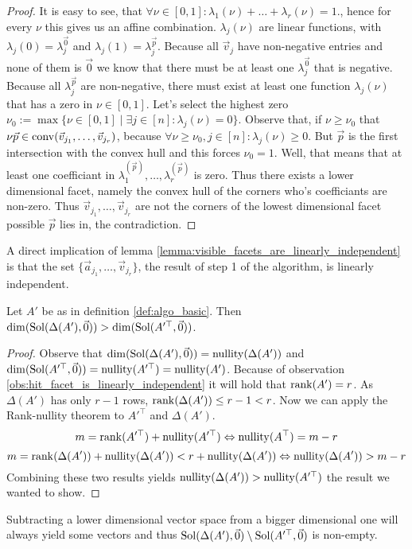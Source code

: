 \begin{proof}
    It is easy to see, that $\forall \nu\in[0, 1]: \lambda_1(\nu) + \dots + \lambda_r(\nu) = 1$., hence for every $\nu$ this gives us an affine combination. $\lambda_j(\nu)$ are linear functions, with $\lambda_j(0) = \lambda_j^{\vec 0}$ and $\lambda_j(1) = \lambda_j^{\vec p}$. Because all $\vec v_j$ have non-negative entries and none of them is $\vec 0$ we know that there must be at least one $\lambda_j^{\vec 0}$ that is negative. Because all $\lambda_j^{\vec p}$ are non-negative, there must exist at least one function $\lambda_j(\nu)$ that has a zero in $\nu \in [0, 1]$. Let's select the highest zero $\nu_0 := \max\{\nu \in [0, 1]\mid \exists j\in [n]\colon \lambda_j(\nu) = 0\}$. Observe that, if $\nu \geq \nu_0$ that $\nu\vec p \in \operatorname{conv}(\vec v_{j_1}, \dots, \vec v_{j_r})$, because $\forall \nu \geq \nu_0, j\in[n]\colon \lambda_j(\nu) \geq 0$. But $\vec p$ is the first intersection with the convex hull and this forces $\nu_0 = 1$. Well, that means that at least one coefficiant in $\lambda^{(\vec p)}_1, \dots, \lambda^{(\vec p)}_r$ is zero. Thus there exists a lower dimensional facet, namely the convex hull of the corners who's coefficiants are non-zero. Thus $\vec v_{j_1}, \dots, \vec v_{j_r}$ are not the corners of the lowest dimensional facet possible $\vec p$ lies in, the contradiction.
\end{proof}

\begin{observation}
    \label{obs:hit_facet_is_linearly_independent}
    A direct implication of lemma \ref{lemma:visible_facets_are_linearly_independent} is that the set $\{\vec a_{j_1}, \dots, \vec v_{j_r}\}$, the result of step 1 of the algorithm, is linearly independent.  
\end{observation}

\begin{lemma}
    \label{lemma:solspace_big_enough}
    Let $A'$ be as in definition \ref{def:algo_basic}. Then $\dim(\operatorname{Sol}(\Delta(A'), \vec0)) > \dim(\operatorname{Sol}(A'^\top, \vec0))$.
\end{lemma}
\begin{proof}
    Observe that $\dim(\operatorname{Sol}(\Delta(A'), \vec0)) = \operatorname{nullity}(\Delta(A'))$ and $\dim(\operatorname{Sol}(A'^\top, \vec0)) = \operatorname{nullity}(A'^\top) = \operatorname{nullity}(A')$. Because of observation \ref{obs:hit_facet_is_linearly_independent} it will hold that $\operatorname{rank}(A') = r$. As $\Delta(A')$ has only $r-1$ rows, $\operatorname{rank}(\Delta(A')) \leq r-1 < r$. Now we can apply the Rank-nullity theorem to $A'^\top$ and $\Delta(A')$.
    $$m = \operatorname{rank}(A'^\top) + \operatorname{nullity}(A'^\top) \Leftrightarrow \operatorname{nullity}(A^\top) = m - r$$
    $$m = \operatorname{rank}(\Delta(A')) + \operatorname{nullity}(\Delta(A')) < r + \operatorname{nullity}(\Delta(A'))\Leftrightarrow \operatorname{nullity}(\Delta(A')) > m - r$$
    Combining these two results yields $\operatorname{nullity}(\Delta(A')) > \operatorname{nullity}(A'^\top)$ the result we wanted to show.
\end{proof}
Subtracting a lower dimensional vector space from a bigger dimensional one will always yield some vectors and thus $\operatorname{Sol}(\Delta(A'), \vec0) \setminus \operatorname{Sol}(A'^\top, \vec0)$ is non-empty.


